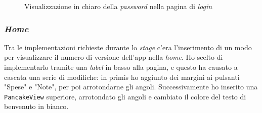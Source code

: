 \begin{figure}[H]
\begin{subfigure}{.5\textwidth}
    \end{subfigure}
    \caption{Visualizzazione in chiaro della \textit{password} nella pagina di \textit{login}}
\end{figure}



\subsubsection{\textit{Home}}

Tra le implementazioni richieste durante lo \textit{stage} c'era l'inserimento di un modo per visualizzare il numero di versione dell'app nella \textit{home}. Ho scelto di implementarlo tramite una \textit{label} in basso alla pagina, e questo ha causato a cascata una serie di modifiche: in primis ho aggiunto dei margini ai pulsanti "Spese" e "Note", per poi arrotondarne gli angoli. Successivamente ho inserito una \texttt{PancakeView} superiore, arrotondato gli angoli e cambiato il colore del testo di benvenuto in bianco.

